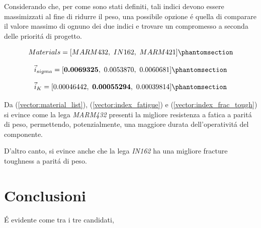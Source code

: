 \documentclass{article}
\begin{document}
        Considerando che, per come sono stati definiti, tali indici devono essere massimizzati al fine di ridurre il peso, 
        una possibile opzione é quella di comparare il valore massimo di ognuno dei due indici e trovare un compromesso
        a seconda delle prioritá di progetto.

        \begin{equation}
            Materials = [MARM432, \ IN162, \ MARM421] 
            \phantomsection \label{vector:material_list}
        \end{equation}

        \begin{equation}
            \vec{i}_{sigma} = [\textbf{0.0069325}, \  0.0053870, \  0.0060681
            ]
            \phantomsection \label{vector:index_fatigue}
        \end{equation}

        \begin{equation}
            \vec{i}_{K} = [0.00046442, \  \textbf{0.00055294}, \  0.00039814]
            \phantomsection \label{vector:index_frac_tough}
        \end{equation}

        Da (\ref{vector:material_list}), (\ref{vector:index_fatigue}) e (\ref{vector:index_frac_tough}) si evince come 
        la lega \textit{MARM432} presenti la migliore resistenza a fatica a paritá di peso, permettendo, potenzialmente, 
        una maggiore durata dell'operativitá del componente.

        D'altro canto, si evince anche che la lega \textit{IN162} ha una migliore fracture toughness a paritá di peso. 

        
        \clearpage


    \section{Conclusioni\label{conclusioni}}

    É evidente come tra i tre candidati, 

    \autocite{Co_Ni_EBM}

    \clearpage

    \printbibliography
    
\end{document}
